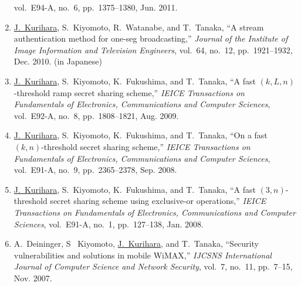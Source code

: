 \begin{enumerate}
       vol.~E94-A, no.~6, pp.~1375--1380, Jun. 2011.
 \item \underline{J.~Kurihara}, S.~Kiyomoto, R.~Watanabe, and
       T.~Tanaka, ``A stream authentication method for one-seg
       broadcasting,'' \textit{Journal of the Institute of Image
       Information and Television Engineers},
       vol.~64, no.~12, pp.~1921--1932, Dec. 2010. (in Japanese)
 \item \underline{J.~Kurihara}, S.~Kiyomoto, K.~Fukushima, and
       T.~Tanaka, ``A fast $(k,L,n)$-threshold ramp secret sharing
       scheme,'' \textit{IEICE Transactions on Fundamentals of Electronics, Communications and Computer Sciences},
       vol.~E92-A, no.~8, pp.~1808--1821, Aug. 2009.
 \item \underline{J.~Kurihara}, S.~Kiyomoto, K.~Fukushima, and
       T.~Tanaka, ``On a fast $(k,n)$-threshold secret sharing scheme,''
       \textit{IEICE Transactions on Fundamentals of Electronics, Communications and Computer Sciences},
       vol.~E91-A, no.~9, pp.~2365--2378, Sep. 2008.
 \item \underline{J.~Kurihara}, S.~Kiyomoto, K.~Fukushima, and
       T.~Tanaka, ``A fast $(3,n)$-threshold secret sharing scheme using
       exclusive-or operations,''
       \textit{IEICE Transactions on Fundamentals of Electronics, Communications and Computer Sciences},
       vol.~E91-A, no.~1, pp.~127--138, Jan. 2008.
 \item A.~Deininger, S~ Kiyomoto, \underline{J.~Kurihara}, and
       T.~Tanaka, ``Security vulnerabilities and solutions in mobile
       WiMAX,'' \textit{IJCSNS International Journal of Computer Science
       and Network Security}, vol.~7, no.~11, pp.~7--15, Nov. 2007.
\end{enumerate}


